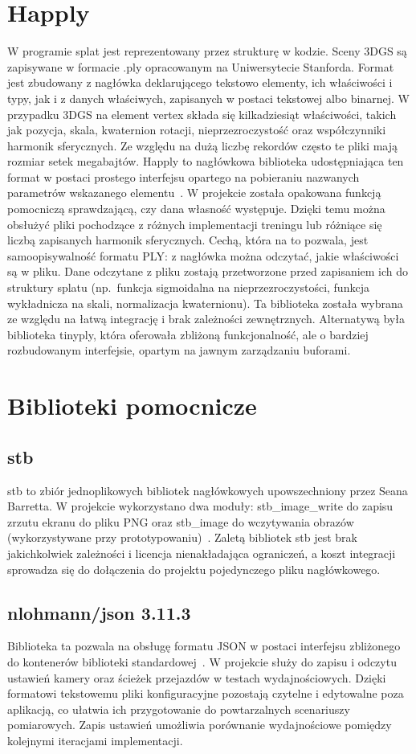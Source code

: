 \section{Happly}
\label{happly}
W programie splat jest reprezentowany przez strukturę w kodzie. Sceny 3DGS są zapisywane w formacie .ply opracowanym na Uniwersytecie Stanforda. Format jest zbudowany z nagłówka deklarującego tekstowo elementy, ich właściwości i typy, jak i z danych właściwych, zapisanych w postaci tekstowej albo binarnej. W przypadku 3DGS na element vertex składa się kilkadziesiąt właściwości, takich jak pozycja, skala, kwaternion rotacji, nieprzezroczystość oraz współczynniki harmonik sferycznych. Ze względu na dużą liczbę rekordów często te pliki mają rozmiar setek megabajtów. Happly to nagłówkowa biblioteka udostępniająca ten format w postaci prostego interfejsu opartego na pobieraniu nazwanych parametrów wskazanego elementu~\cite{happlyrepo}. W projekcie została opakowana funkcją pomocniczą sprawdzającą, czy dana własność występuje. Dzięki temu można obsłużyć pliki pochodzące z różnych implementacji treningu lub różniące się liczbą zapisanych harmonik sferycznych. Cechą, która na to pozwala, jest samoopisywalność formatu PLY: z nagłówka można odczytać, jakie właściwości są w pliku. Dane odczytane z pliku zostają przetworzone przed zapisaniem ich do struktury splatu (np.\ funkcja sigmoidalna na nieprzezroczystości, funkcja wykładnicza na skali, normalizacja kwaternionu). Ta biblioteka została wybrana ze względu na łatwą integrację i brak zależności zewnętrznych. Alternatywą była biblioteka tinyply, która oferowała zbliżoną funkcjonalność, ale o bardziej rozbudowanym interfejsie, opartym na jawnym zarządzaniu buforami.
\section{Biblioteki pomocnicze}
\label{help_lib}
\subsection{stb}
\label{stb}
stb to zbiór jednoplikowych bibliotek nagłówkowych upowszechniony przez Seana Barretta. W projekcie wykorzystano dwa moduły: stb\_image\_write do zapisu zrzutu ekranu do pliku PNG oraz stb\_image do wczytywania obrazów (wykorzystywane przy prototypowaniu)~\cite{stbrepo}. Zaletą bibliotek stb jest brak jakichkolwiek zależności i licencja nienakładająca ograniczeń, a koszt integracji sprowadza się do dołączenia do projektu pojedynczego pliku nagłówkowego.
\subsection{nlohmann/json 3.11.3}
\label{json}
Biblioteka ta pozwala na obsługę formatu JSON w postaci interfejsu zbliżonego do kontenerów biblioteki standardowej~\cite{nlohmannJsonDocs}. W projekcie służy do zapisu i odczytu ustawień kamery oraz ścieżek przejazdów w testach wydajnościowych. Dzięki formatowi tekstowemu pliki konfiguracyjne pozostają czytelne i edytowalne poza aplikacją, co ułatwia ich przygotowanie do powtarzalnych scenariuszy pomiarowych. Zapis ustawień umożliwia porównanie wydajnościowe pomiędzy kolejnymi iteracjami implementacji.
